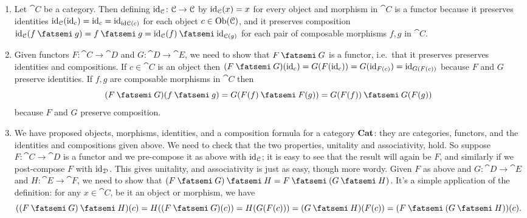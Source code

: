 \documentclass[7Sketches]{subfiles}
\begin{document}
{
\begin{enumerate}
	\item Let $\cat{C}$ be a category. Then defining $\mathrm{id}_{\mathcal{C}}\colon\mathcal{C}\to\mathcal{C}$ by $\mathrm{id}_{\mathcal{C}}(x)=x$ for every object and morphism in $\cat{C}$ is a functor because it preserves identities $\mathrm{id}_{\mathcal{C}}(\mathrm{id}_c)=\mathrm{id}_c=\mathrm{id}_{\mathrm{id}{\mathcal{C}}(c)}$ for each object $c\in\operatorname{Ob}(\mathcal{C})$, and it preserves composition $\id_{\cat{C}}(f\cp g)=f\cp g=\id_\cat{C}(f)\cp\id_{\cat{C}(g)}$ for each pair of composable morphisms $f,g$ in $\cat{C}$.
	\item Given functors $F\colon\cat{C}\to\cat{D}$ and $G\colon\cat{D}\to\cat{E}$, we need to show that $F\cp G$ is a functor, i.e.\ that it preserves preserves identities and compositions. If $c\in\cat{C}$ is an object then $(F\cp G)(\id_c)=G(F(\id_c))=G(\id_{F(c)})=\id_{G(F(c))}$ because $F$ and $G$ preserve identities. If $f,g$ are composable morphisms in $\cat{C}$ then
	\[(F\cp G)(f\cp g)=G(F(f)\cp F(g))=G(F(f))\cp G(F(g))\]
	because $F$ and $G$ preserve composition.
	\item We have proposed objects, morphisms, identities, and a composition formula for a category $\mathbf{Cat}$: they are categories, functors, and the identities and compositions given above. We need to check that the two properties, unitality and associativity, hold. So suppose $F\colon\cat{C}\to\cat{D}$ is a functor and we pre-compose it as above with $\mathrm{id}_{\mathcal{C}}$; it is easy to see that the result will again be $F$, and similarly if we post-compose $F$ with $\mathrm{id}_{\mathcal{D}}$. This gives unitality, and associativity is just as easy, though more wordy. Given $F$ as above and $G\colon\cat{D}\to\cat{E}$ and $H\colon\cat{E}\to\cat{F}$, we need to show that $(F\cp G)\cp H=F\cp (G\cp H)$. It's a simple application of the definition: for any $x\in\cat{C}$, be it an object or morphism, we have
	\[((F\cp G)\cp H)(c)=H((F\cp G)(c))=H(G(F(c)))=(G\cp H)(F(c))=(F\cp(G\cp H))(c).\]
\end{enumerate}
}

\end{document}
